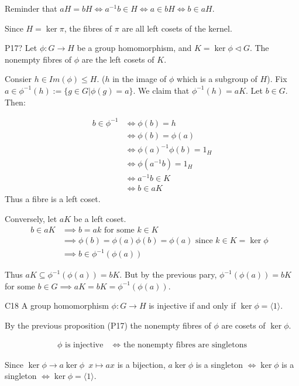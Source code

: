 \documentclass{article}
\begin{document}
Reminder that $aH = bH \iff a^{-1}b \in H \iff a \in bH \iff b \in aH$. 

Since $H = \ker{\pi}$, the fibres of $\pi$ are all left cosets of the kernel. 

\begin{cprop}{P17?}{}
    Let $\phi: G \to H$ be a group homomorphism, and $K = \ker{\phi} \triangleleft G$. The nonempty fibres of $\phi$ are the left cosets of $K$. 

    \begin{cpf}
        Consier $h \in Im(\phi) \leq H$. ($h$ in the image of $\phi$ which is a subgroup of $H$). Fix $a \in \phi^{-1}(h) := \{ g \in G | \phi(g) = a \}$. We claim that $\phi^{-1}(h) = aK$. Let $b \in G$. Then:

        \begin{align*}
            b \in \phi^{-1} & \iff \phi(b) = h\\
            & \iff \phi(b) = \phi(a) \\
            & \iff \phi(a)^{-1}\phi(b) = 1_H\\
            & \iff \phi(a^{-1}b) = 1_H \\
            & \iff a^{-1}b \in K\\
            & \iff b \in aK
        \end{align*}
        Thus a fibre is a left coset.

        Conversely, let $aK$ be a left coset. 
        \begin{align*}
            b \in aK & \implies b = ak \text{ for some $k \in K$}\\
            & \implies \phi(b) = \phi(a)\phi(b) = \phi(a) \text{ since $k \in K = \ker{\phi}$ }\\
            & \implies b \in \phi^{-1}(\phi(a))
        \end{align*}

        Thus $ aK \subseteq \phi^{-1}(\phi(a)) = bK$. But by the previous pary, $\phi^{-1}(\phi(a)) = bK$ for some $b \in G \implies aK = bK = \phi^{-1}(\phi(a))$. 
    \end{cpf}
\end{cprop}

\begin{ccor}{C18}{}
    A group homomorphism $\phi : G \to H$ is injective if and only if $\ker{\phi} = \langle 1 \rangle$. 

    \begin{cpf}
        By the previous proposition (P17) the nonempty fibres of $\phi$ are cosets of $\ker{\phi}$. 

        \begin{align*}
            \phi \text{ is injective } & \iff \text{ the nonempty fibres are singletons} 
        \end{align*}

        Since $\ker{\phi} \to a \ker{\phi} \, \, \, x \mapsto ax$ is a bijection, $a \ker{\phi}$  is a singleton $\iff \ker{\phi}$ is a singleton $\iff \ker{\phi} = \langle 1 \rangle$. 
    \end{cpf}
\end{ccor}
\end{document}
